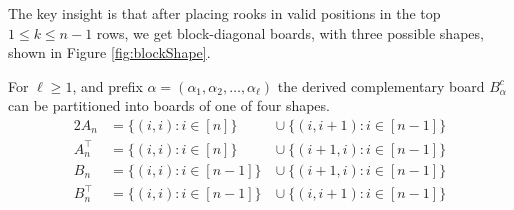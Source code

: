 The key insight is that after placing rooks in valid positions in
the top $1 \leq k \leq n-1$ rows, we get block-diagonal boards,
with three possible shapes, shown in Figure \ref{fig:blockShape}.
\begin{lemma}
  For $\ell \geq 1$, and prefix $\alpha = (\alpha_1, \alpha_2, \dots, \alpha_\ell)$
  the derived complementary board $B_\alpha^c$ can be partitioned into boards
  of one of four shapes.
  \begin{alignat*}{2}
    A_n      &= \{(i,i) : i \in [n]\}   &\cup\ \{(i,i+1) : i \in [n-1]\} \\ %
    A^\top_n &= \{(i,i) : i \in [n]\}   &\cup\ \{(i+1,i) : i \in [n-1]\} \\ %
    B_n      &= \{(i,i) : i \in [n-1]\}\ &\cup\ \{(i+1,i) : i \in [n-1]\} \\ %
    B^\top_n &= \{(i,i) : i \in [n-1]\}\ &\cup\ \{(i,i+1) : i \in [n-1]\} %
  \end{alignat*}
\end{lemma}
